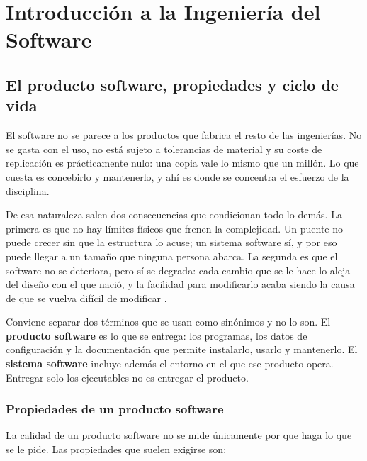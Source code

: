 \chapter{Introducción a la Ingeniería del Software}

\section{El producto software, propiedades y ciclo de vida}

El software no se parece a los productos que fabrica el resto de las ingenierías.
No se gasta con el uso, no está sujeto a tolerancias de material y su coste de
replicación es prácticamente nulo: una copia vale lo mismo que un millón. Lo que
cuesta es concebirlo y mantenerlo, y ahí es donde se concentra el esfuerzo de la
disciplina.

De esa naturaleza salen dos consecuencias que condicionan todo lo demás. La
primera es que no hay límites físicos que frenen la complejidad. Un puente no
puede crecer sin que la estructura lo acuse; un sistema software sí, y por eso
puede llegar a un tamaño que ninguna persona abarca. La segunda es que el
software no se deteriora, pero sí se degrada: cada cambio que se le hace lo aleja
del diseño con el que nació, y la facilidad para modificarlo acaba siendo la causa
de que se vuelva difícil de modificar \cite{sommerville2016}.

Conviene separar dos términos que se usan como sinónimos y no lo son. El
\textbf{producto software} es lo que se entrega: los programas, los datos de
configuración y la documentación que permite instalarlo, usarlo y mantenerlo. El
\textbf{sistema software} incluye además el entorno en el que ese producto opera.
Entregar solo los ejecutables no es entregar el producto.

\subsection*{Propiedades de un producto software}

La calidad de un producto software no se mide únicamente por que haga lo que se le
pide. Las propiedades que suelen exigirse son:

